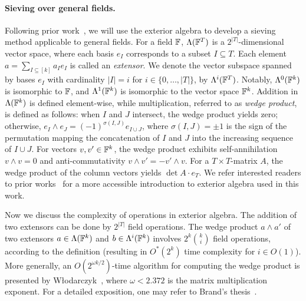 \paragraph*{Sieving over general fields.}

Following prior work~\cite{BrandDH18,EKW23}, we will use the exterior algebra to develop a sieving method applicable to general fields.
For a field $\mathbb F$, $\Lambda(\mathbb F^T)$ is a $2^{|T|}$-dimensional vector space, where each basis $e_I$ corresponds to a subset $I \subseteq T$.
Each element $a = \sum_{I \subseteq [k]} {a_I} e_I$ is called an \emph{extensor}.
We denote the vector subspace spanned by bases $e_I$ with cardinality $|I| = i$ for $i \in \{ 0, \dots, |T| \}$, by $\Lambda^i(\mathbb F^T)$.
Notably, $\Lambda^0(\mathbb F^k)$ is isomorphic to $\mathbb F$, and $\Lambda^1(\mathbb F^k)$ is isomorphic to the vector space $\mathbb F^k$.
Addition in $\Lambda(\mathbb F^k)$ is defined element-wise, while
multiplication, referred to as \emph{wedge product}, is defined as follows:
when $I$ and $J$ intersect, the wedge product yields zero;
otherwise, $e_I \wedge e_J = (-1)^{\sigma(I, J)} e_{I \cup J}$, where $\sigma(I, J) = \pm 1$ is the sign of the permutation mapping the concatenation of $I$ and $J$ into the increasing sequence of $I \cup J$.
For vectors $v, v' \in \mathbb F^k$, the wedge product exhibits self-annihilation $v \wedge v = 0$ and anti-commutativity $v \wedge v' = -v' \wedge v$. 
For a $T \times T$-matrix $A$, the wedge product of the column vectors yields $\det A \cdot e_T$.
We refer interested readers to prior works~\cite{BrandDH18,EKW23} for a more accessible introduction to exterior algebra used in this work.


Now we discuss the complexity of operations in exterior algebra.
The addition of two extensors can be done by $2^{|T|}$ field operations.
The wedge product $a \wedge a'$ of two extensors $a \in \Lambda(\mathbb F^k)$ and $b \in \Lambda^i(\mathbb F^k)$ involves $2^k \binom{k}{i}$ field operations, according to the definition (resulting in $O^*(2^k)$ time complexity for $i \in O(1)$).
More generally, an $O(2^{\omega k / 2})$-time algorithm for computing the wedge product is presented by W\l{}odarczyk~\cite{Wlodarczyk19}, where $\omega < 2.372$ is the matrix multiplication exponent.
For a detailed exposition, one may refer to Brand's thesis~\cite{Brand19thesis}.

